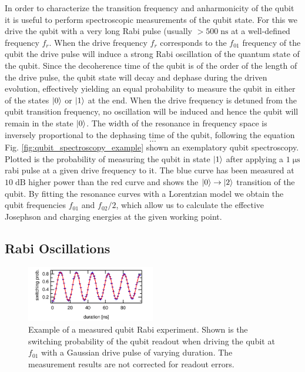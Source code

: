 In order to characterize the transition frequency and anharmonicity of the qubit it is useful to perform spectroscopic measurements of the qubit state. For this we drive the qubit with a very long Rabi pulse (usually $> 500\;\mathrm{ns}$ at a well-defined frequency $f_r$. When the drive frequency $f_r$ corresponds to the $f_{01}$ frequency of the qubit the drive pulse will induce a strong Rabi oscillation of the quantum state of the qubit. Since the decoherence time of the qubit is of the order of the length of the drive pulse, the qubit state will decay and dephase during the driven evolution, effectively yielding an equal probability to measure the qubit in either of the states $\left| 0 \right>$ or $\left| 1 \right>$ at the end. When the drive frequency is detuned from the qubit transition frequency, no oscillation will be induced and hence the qubit will remain in the state $\left| 0 \right>$. The width of the resonance in frequency space is inversely proportional to the dephasing time of the qubit, following the equation
%
\begin{equation}
...
\end{equation}
%
Fig. \ref{fig:qubit_spectroscopy_example} shown an exemplatory qubit spectroscopy. Plotted is the probability of measuring the qubit in state $\left| 1 \right>$ after applying a $1\;\mathrm{\mu s}$ rabi pulse at a given drive frequency to it. The blue curve has been measured at $10\;\mathrm{dB}$ higher power than the red curve and shows the $\left| 0 \right>\to\left| 2 \right>$ transition of the qubit. By fitting the resonance curves with a Lorentzian model we obtain the qubit frequencies $f_{01}$ and $f_{02}/2$, which allow us to calculate the effective Josephson and charging energies at the given working point.

\subsection{Rabi Oscillations}

\begin{figure}[ht!]
\centering
\includegraphics[width=0.5\textwidth]{"./data/ct5/2011_04_21 - grover and tomo/example - qubit 2 rabi"}
\caption[]{Example of a measured qubit Rabi experiment. Shown is the switching probability of the qubit readout when driving the qubit at $f_{01}$ with a Gaussian drive pulse of varying duration. The measurement results are not corrected for readout errors.}
\label{fig:qubit_rabi_example}
\end{figure}

